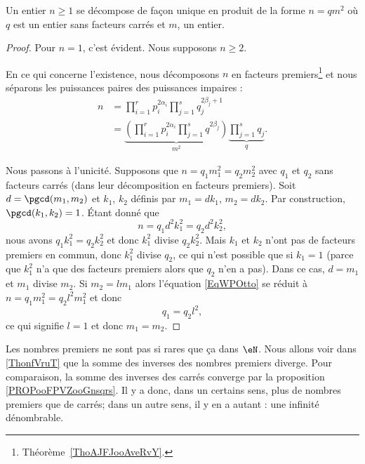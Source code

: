 \begin{lemma}   \label{LemheKdsa}
	Un entier \( n\geq 1\) se décompose de façon unique en produit de la forme \( n=qm^2\) où \( q\) est un entier sans facteurs carrés et \( m\), un entier.
\end{lemma}

\begin{proof}
	Pour \( n=1\), c'est évident. Nous supposons \( n\geq 2\).

	En ce qui concerne l'existence, nous décomposons \( n\) en facteurs premiers\footnote{Théorème~\ref{ThoAJFJooAveRvY}.} et nous séparons les puissances paires des puissances impaires :
	\begin{subequations}
		\begin{align}
			n & = \prod_{i=1}^r p_i^{2\alpha_i}\prod_{j=1}^sq_{j}^{2\beta_j+1}                                                              \\
			  & = \underbrace{\left( \prod_{i=1}^rp_i^{2\alpha_i}\prod_{j=1}^sq^{2\beta_j} \right)}_{m^2}\underbrace{\prod_{j=1}^sq_j}_{q}.
		\end{align}
	\end{subequations}

	Nous passons à l'unicité. Supposons que \( n=q_1m_1^2=q_2m_2^2\) avec \( q_1\) et \( q_2\) sans facteurs carrés (dans leur décomposition en facteurs premiers). Soit \( d=\pgcd(m_1,m_2)\) et \( k_1\), \( k_2\) définis par \( m_1=dk_1\), \( m_2=dk_2\). Par construction, \( \pgcd(k_1,k_2)=1\). Étant donné que
	\begin{equation}        \label{EqWPOtto}
		n=q_1d^2k_1^2=q_2d^2k_2^2,
	\end{equation}
	nous avons \( q_1k_1^2=q_2k_2^2\) et donc \( k_1^2\) divise \( q_2k_2^2\). Mais \( k_1\) et \( k_2\) n'ont pas de facteurs premiers en commun, donc \( k_1^2\) divise \( q_2\), ce qui n'est possible que si \( k_1=1\) (parce que \( k_1^2\) n'a que des facteurs premiers alors que \( q_2\) n'en a pas). Dans ce cas, \( d=m_1\) et \( m_1\) divise \( m_2\). Si \( m_2=lm_1\) alors l'équation \eqref{EqWPOtto} se réduit à  \( n=q_1m_1^2=q_2l^2m_1^2\) et donc
	\begin{equation}
		q_1=q_2l^2,
	\end{equation}
	ce qui signifie \( l=1\) et donc \( m_1=m_2\).
\end{proof}

Les nombres premiers ne sont pas si rares que ça dans \( \eN\). Nous allons voir dans \ref{ThonfVruT} que la somme des inverses des nombres premiers diverge. Pour comparaison, la somme des inverses des carrés converge par la proposition \ref{PROPooFPVZooGnsqrs}. Il y a donc, dans un certains sens, plus de nombres premiers que de carrés; dans un autre sens, il y en a autant : une infinité dénombrable.

